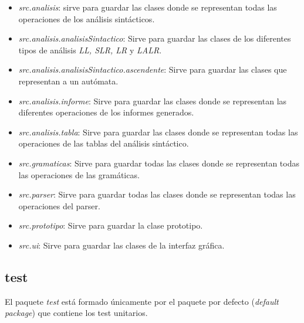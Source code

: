 \begin{itemize}
\item \textit{src.analisis}: sirve para guardar las clases donde se representan todas las operaciones de los análisis sintácticos.
\item \textit{src.analisis.analisisSintactico}: 
Sirve para guardar las clases de los diferentes tipos de análisis 
\textit{LL, SLR, LR} y \textit{LALR}.
\item \textit{src.analisis.analisisSintactico.ascendente}: 
Sirve para guardar las clases que representan a un autómata.
\newpage
\item \textit{src.analisis.informe}: Sirve para guardar las clases donde se representan las diferentes operaciones de los informes generados.
\item \textit{src.analisis.tabla}: Sirve para guardar las clases donde se representan todas las operaciones de las tablas del análisis sintáctico.
\newpage
\item \textit{src.gramaticas}: Sirve para guardar todas las clases donde se representan todas las operaciones de las gramáticas.
\item \textit{src.parser}: Sirve para guardar todas las clases donde se representan todas las operaciones del parser.
\newpage
\item \textit{src.prototipo}: Sirve para guardar la clase prototipo.
\item \textit{src.ui}: Sirve para guardar las clases de la interfaz gráfica.

\end{itemize}

\subsection{test}

El paquete \textit{test} está formado únicamente por el paquete por defecto (\textit{default package}) que contiene los test unitarios.